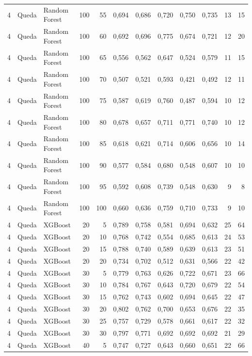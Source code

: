 \begin{longtable}{@{}rllrrrrrrrrr@{}}
4 & Queda & Random Forest & 100 & 55 & 0,694 & 0,686 & 0,720 & 0,750 & 0,735 & 13 & 15 \\
4 & Queda & Random Forest & 100 & 60 & 0,692 & 0,696 & 0,775 & 0,674 & 0,721 & 12 & 20 \\
4 & Queda & Random Forest & 100 & 65 & 0,556 & 0,562 & 0,647 & 0,524 & 0,579 & 11 & 15 \\
4 & Queda & Random Forest & 100 & 70 & 0,507 & 0,521 & 0,593 & 0,421 & 0,492 & 12 & 11 \\
4 & Queda & Random Forest & 100 & 75 & 0,587 & 0,619 & 0,760 & 0,487 & 0,594 & 10 & 12 \\
4 & Queda & Random Forest & 100 & 80 & 0,678 & 0,657 & 0,711 & 0,771 & 0,740 & 10 & 12 \\
4 & Queda & Random Forest & 100 & 85 & 0,618 & 0,621 & 0,714 & 0,606 & 0,656 & 10 & 14 \\
4 & Queda & Random Forest & 100 & 90 & 0,577 & 0,584 & 0,680 & 0,548 & 0,607 & 10 & 10 \\
4 & Queda & Random Forest & 100 & 95 & 0,592 & 0,608 & 0,739 & 0,548 & 0,630 & 9 & 8 \\
4 & Queda & Random Forest & 100 & 100 & 0,660 & 0,636 & 0,759 & 0,710 & 0,733 & 9 & 10 \\
4 & Queda & XGBoost & 20 & 5 & 0,789 & 0,758 & 0,581 & 0,694 & 0,632 & 25 & 64 \\
4 & Queda & XGBoost & 20 & 10 & 0,768 & 0,742 & 0,554 & 0,685 & 0,613 & 24 & 53 \\
4 & Queda & XGBoost & 20 & 15 & 0,788 & 0,740 & 0,589 & 0,639 & 0,613 & 23 & 51 \\
4 & Queda & XGBoost & 20 & 20 & 0,734 & 0,702 & 0,512 & 0,631 & 0,566 & 22 & 42 \\
4 & Queda & XGBoost & 30 & 5 & 0,779 & 0,763 & 0,626 & 0,722 & 0,671 & 23 & 66 \\
4 & Queda & XGBoost & 30 & 10 & 0,784 & 0,767 & 0,643 & 0,720 & 0,679 & 22 & 54 \\
4 & Queda & XGBoost & 30 & 15 & 0,762 & 0,743 & 0,602 & 0,694 & 0,645 & 22 & 47 \\
4 & Queda & XGBoost & 30 & 20 & 0,802 & 0,762 & 0,700 & 0,653 & 0,676 & 22 & 35 \\
4 & Queda & XGBoost & 30 & 25 & 0,757 & 0,729 & 0,578 & 0,661 & 0,617 & 22 & 32 \\
4 & Queda & XGBoost & 30 & 30 & 0,797 & 0,771 & 0,692 & 0,692 & 0,692 & 21 & 29 \\
4 & Queda & XGBoost & 40 & 5 & 0,747 & 0,727 & 0,643 & 0,660 & 0,651 & 22 & 66 \\

\end{longtable}
